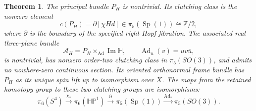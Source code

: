 \documentclass[11pt]{article}
\newtheorem{theorem}{Theorem}[section]
\theoremstyle{definition}
\begin{document}
\begin{theorem}
\label{rettri:bundleclass}
The principal bundle $P_H$ is nontrivial. Its clutching class is the
nonzero element
\begin{equation}
 c(P_H)=\partial[\chi H d]\in\pi_5(\operatorname{Sp}(1))
                  \cong\mathbb Z/2,
 \label{rettri:clutch}
\end{equation}
where $\partial$ is the boundary of the specified right Hopf fibration.
The associated real three-plane bundle
\begin{equation}
 \mathcal A_H=P_H\times_{\operatorname{Ad}}\operatorname{Im}\mathbb H,
 \qquad \operatorname{Ad}_u(v)=uv\overline u,
 \label{rettri:rankthree}
\end{equation}
is nontrivial, has nonzero order-two clutching class in
$\pi_5(SO(3))$, and admits no nowhere-zero continuous section.
Its oriented orthonormal frame bundle has $P_H$ as its unique spin lift
up to isomorphism over $X$. The maps from the retained homotopy group
to these two clutching groups are isomorphisms:
\begin{equation}
 \pi_6(S^4)\xrightarrow{\chi_*}\pi_6(\mathbb H\mathbb P^1)
 \xrightarrow{\partial}\pi_5(\operatorname{Sp}(1))
 \xrightarrow{\operatorname{Ad}_*}\pi_5(SO(3)).
 \label{rettri:exact-detection}
\end{equation}
\end{theorem}
\end{document}
